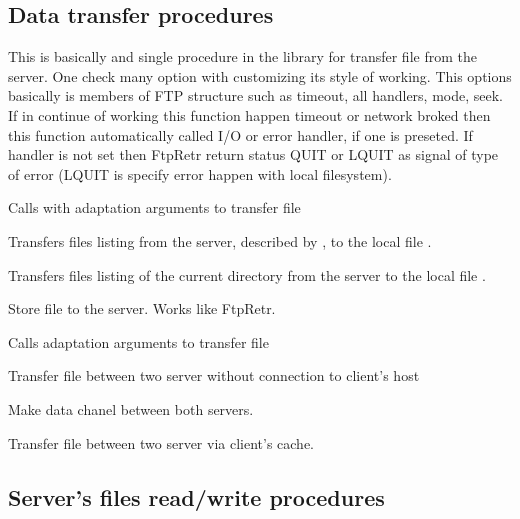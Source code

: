 \subsection{Data transfer procedures}

{
	This is basically and single procedure in the library for transfer
	file from the server. One check many option with customizing its style
	of working. This options basically is members of FTP structure such
	as timeout, all handlers, mode, seek. If in continue of working this
	function happen timeout or network broked then this function 
	automatically called I/O or error handler, if one is preseted.
        If handler is not set then FtpRetr return
	status QUIT or LQUIT as signal of type of error (LQUIT is specify
	error happen with local filesystem). \\

}

{
 Calls  with adaptation arguments to transfer file
}

{
 Transfers files listing from the server, described by , to the local file .
}

{
 Transfers files listing of the current directory from the server to the local file .
}

{
  Store file to the server. Works like FtpRetr.
}

{
 Calls  adaptation arguments to transfer file 
}

{
 Transfer file between two server without connection to client's host
}

{
 Make data chanel between both servers. 
}

{
 Transfer file between two server via client's cache.
}

\subsection{Server's files read/write procedures}

